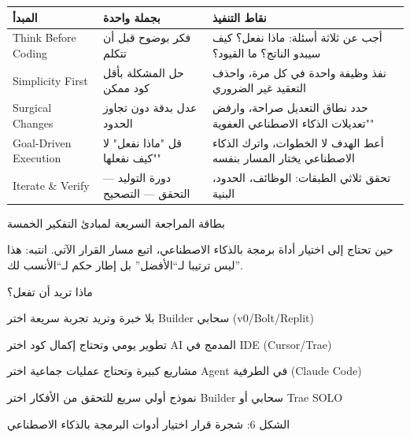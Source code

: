 


\begin{center}
\begin{tabularx}{\linewidth}{|X|X|X|}
\hline
\textbf{المبدأ} & \textbf{بجملة واحدة} & \textbf{نقاط التنفيذ} \tabularnewline
\hline
Think Before Coding & فكر بوضوح قبل أن تتكلم & أجب عن ثلاثة أسئلة: ماذا نفعل؟ كيف سيبدو الناتج؟ ما القيود؟ \tabularnewline
Simplicity First & حل المشكلة بأقل كود ممكن & نفذ وظيفة واحدة في كل مرة، واحذف التعقيد غير الضروري \tabularnewline
Surgical Changes & عدل بدقة دون تجاوز الحدود & حدد نطاق التعديل صراحة، وارفض "تعديلات الذكاء الاصطناعي العفوية" \tabularnewline
Goal-Driven Execution & قل "ماذا نفعل" لا "كيف نفعلها" & أعط الهدف لا الخطوات، واترك الذكاء الاصطناعي يختار المسار بنفسه \tabularnewline
Iterate \& Verify & دورة التوليد — التحقق — التصحيح & تحقق ثلاثي الطبقات: الوظائف، الحدود، البنية \tabularnewline
\hline
\end{tabularx}
\end{center}

\begin{center}\small\color{gray}بطاقة المراجعة السريعة لمبادئ التفكير الخمسة\end{center}


حين تحتاج إلى اختيار أداة برمجة بالذكاء الاصطناعي، اتبع مسار القرار الآتي. انتبه: هذا ليس ترتيبا لـ“الأفضل” بل إطار حكم لـ“الأنسب لك”.

ماذا تريد أن تفعل؟

بلا خبرة وتريد تجربة سريعة اختر Builder سحابي (v0/Bolt/Replit)

تطوير يومي وتحتاج إكمال كود اختر AI المدمج في IDE (Cursor/Trae)

مشاريع كبيرة وتحتاج عمليات جماعية اختر Agent في الطرفية (Claude Code)

نموذج أولي سريع للتحقق من الأفكار اختر Builder سحابي أو Trae SOLO

\begin{center}\small\color{gray}الشكل 6: شجرة قرار اختيار أدوات البرمجة بالذكاء الاصطناعي\end{center}

